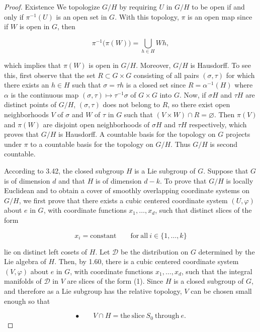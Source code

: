 \begin{proof}
Existence We topologize $G/H$ by requiring $U$ in $G/H$ to be open if and only if $\pi^{-1}(U)$ is an open set in $G$. With this topology, $\pi$ is an open map since if $W$ is open in $G$, then

\[
\pi^{-1}\bigl(\pi(W)\bigr)=\bigcup_{h\in H}W h,
\]

which implies that $\pi(W)$ is open in $G/H$. Moreover, $G/H$ is Hausdorff. To see this, first observe that the set $R \subset G \times G$ consisting of all pairs $(\sigma, \tau)$ for which there exists an $h \in H$ such that $\sigma = \tau h$ is a closed set since $R = \alpha^{-1}(H)$ where $\alpha$ is the continuous map $(\sigma, \tau) \mapsto \tau^{-1}\sigma$ of $G \times G$ into $G$. Now, if $\sigma H$ and $\tau H$ are distinct points of $G/H$, $(\sigma, \tau)$ does not belong to $R$, so there exist open neighborhoods $V$ of $\sigma$ and $W$ of $\tau$ in $G$ such that $(V \times W) \cap R = \varnothing$. Then $\pi(V)$ and $\pi(W)$ are disjoint open neighborhoods of $\sigma H$ and $\tau H$ respectively, which proves that $G/H$ is Hausdorff. A countable basis for the topology on $G$ projects under $\pi$ to a countable basis for the topology on $G/H$. Thus $G/H$ is second countable.

According to 3.42, the closed subgroup $H$ is a Lie subgroup of $G$. Suppose that $G$ is of dimension $d$ and that $H$ is of dimension $d-k$. To prove that $G/H$ is locally Euclidean and to obtain a cover of smoothly overlapping coordinate systems on $G/H$, we first prove that there exists a cubic centered coordinate system $(U,\varphi)$ about $e$ in $G$, with coordinate functions $x_{1},\ldots,x_{d}$, such that distinct slices of the form

\begin{equation}
\tag{1}\label{eq:3.58:1}
x_{i}=\mathrm{constant}\qquad\mathrm{for~all~}i\in\{1,\ldots,k\}
\end{equation}

lie on distinct left cosets of $H$. Let $\mathcal{D}$ be the distribution on $G$ determined by the Lie algebra of $H$. Then, by 1.60, there is a cubic centered coordinate system $(V,\varphi)$ about $e$ in $G$, with coordinate functions $x_{1},\ldots,x_{d}$, such that the integral manifolds of $\mathcal{D}$ in $V$ are slices of the form (1). Since $H$ is a closed subgroup of $G$, and therefore as a Lie subgroup has the relative topology, $V$ can be chosen small enough so that

\begin{equation}
\tag{2}\label{eq:3.58:2}
\bullet \quad \quad V\cap H=\mathrm{the~slice~}S_{0}\mathrm{~through~}e.
\end{equation}


\end{proof}
